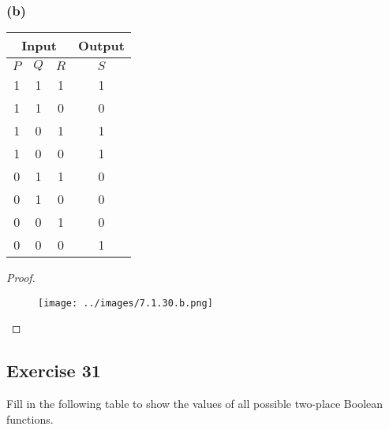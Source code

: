 \documentclass[14pt]{extarticle}
\newcommand{\cy}{\color{cyan}}
\begin{document}
\subsubsection{(b)}
\begin{center}
    \begin{tabular}{|ccc|c|}
        \hline
        \multicolumn{3}{|c|}{\cy Input} & {\cy Output}             \\
        \hline
        $P$                             & $Q$          & $R$ & $S$ \\
        \hline
        1                               & 1            & 1   & 1   \\
        \hline
        1                               & 1            & 0   & 0   \\
        \hline
        1                               & 0            & 1   & 1   \\
        \hline
        1                               & 0            & 0   & 1   \\
        \hline
        0                               & 1            & 1   & 0   \\
        \hline
        0                               & 1            & 0   & 0   \\
        \hline
        0                               & 0            & 1   & 0   \\
        \hline
        0                               & 0            & 0   & 1   \\
        \hline
    \end{tabular}
\end{center}

\begin{proof}
    \begin{figure}[ht!]
        \centering
        \texttt{[image: ../images/7.1.30.b.png]}
    \end{figure}
\end{proof}

\subsection{Exercise 31}
Fill in the following table to show the values of all possible two-place Boolean functions.
\end{document}
